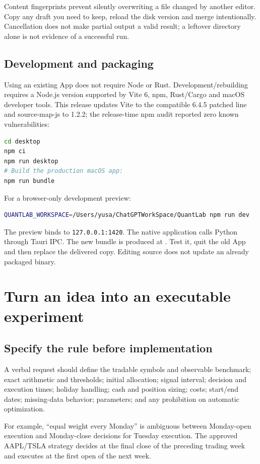 \documentclass[11pt]{article}
\newcommand{\code}[1]{\nolinkurl{#1}}
\newcommand{\chapterpage}{\par}
\let\originalsection\section
\renewcommand{\section}{\Needspace{9\baselineskip}\originalsection}
\let\originalsubsection\subsection
\renewcommand{\subsection}{\Needspace{8\baselineskip}\originalsubsection}
\begin{document}
Content fingerprints prevent silently overwriting a file changed by another editor. Copy any draft you need to keep, reload the disk version and merge intentionally. Cancellation does not make partial output a valid result; a leftover directory alone is not evidence of a successful run.

\subsection{Development and packaging}
Using an existing App does not require Node or Rust. Development/rebuilding requires a Node.js version supported by Vite 6, npm, Rust/Cargo and macOS developer tools. This release updates Vite to the compatible 6.4.5 patched line and source-map-js to 1.2.2; the release-time npm audit reported zero known vulnerabilities:

\begin{lstlisting}[language=bash]
cd desktop
npm ci
npm run desktop
# Build the production macOS app:
npm run bundle
\end{lstlisting}
For a browser-only development preview:
\begin{lstlisting}[language=bash]
QUANTLAB_WORKSPACE=/Users/yusa/ChatGPTWorkSpace/QuantLab npm run dev
\end{lstlisting}
The preview binds to \code{127.0.0.1:1420}. The native application calls Python through Tauri IPC. The new bundle is produced at . Test it, quit the old App and then replace the delivered copy. Editing source does not update an already packaged binary.

\chapterpage
\section{Turn an idea into an executable experiment}
\subsection{Specify the rule before implementation}
A verbal request should define the tradable symbols and observable benchmark; exact arithmetic and thresholds; initial allocation; signal interval; decision and execution times; holiday handling; cash and position sizing; costs; start/end dates; missing-data behavior; parameters; and any prohibition on automatic optimization.

For example, ``equal weight every Monday'' is ambiguous between Monday-open execution and Monday-close decisions for Tuesday execution. The approved AAPL/TSLA strategy decides at the final close of the preceding trading week and executes at the first open of the next week.
\end{document}
